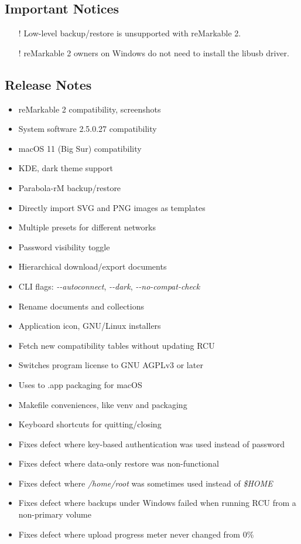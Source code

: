 \subsection{Important Notices}
\begin{itemize}
\item[!]{Low-level backup/restore is unsupported with reMarkable 2.}
\item[!]{reMarkable 2 owners on Windows do not need to install the libusb driver.}
\end{itemize}

\subsection{Release Notes}
\begin{itemize}
\item{reMarkable 2 compatibility, screenshots}
  \item{System software 2.5.0.27 compatibility}
  \item{macOS 11 (Big Sur) compatibility}
  \item{KDE, dark theme support}
    \item{Parabola-rM backup/restore}
  \item{Directly import SVG and PNG images as templates}
  \item{Multiple presets for different networks}
  \item{Password visibility toggle}
  \item{Hierarchical download/export documents}
  \item{CLI flags: \textit{\--\--autoconnect}, \textit{\--\--dark}, \textit{\--\--no-compat-check}}
  \item{Rename documents and collections}
  \item{Application icon, GNU/Linux installers}
  \item{Fetch new compatibility tables without updating RCU}
  \item{Switches program license to GNU AGPLv3 or later}
  \item{Uses to .app packaging for macOS}
  \item{Makefile conveniences, like venv and packaging}
  \item{Keyboard shortcuts for quitting/closing}
  \item{Fixes defect where key-based authentication was used instead of password}
  \item{Fixes defect where data-only restore was non-functional}
  \item{Fixes defect where \textit{/home/root} was sometimes used instead of \textit{\$HOME}}
  \item{Fixes defect where backups under Windows failed when running RCU from a non-primary volume}
  \item{Fixes defect where upload progress meter never changed from 0\%}
\end{itemize}

